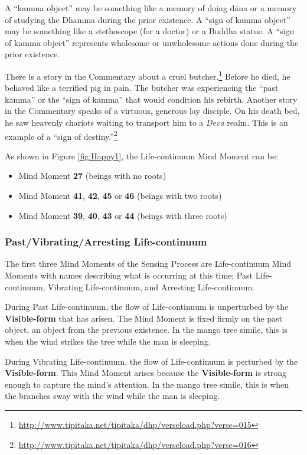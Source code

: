 A “kamma object” may be something like a memory of doing dāna or a memory of studying the Dhamma during the prior existence. A “sign of kamma object” may be something like a stethoscope (for a doctor) or a Buddha statue. A “sign of kamma object” represents wholesome or unwholesome actions done during the prior existence. 

There is a story in the Commentary about a cruel butcher.\footnote{\url{http://www.tipitaka.net/tipitaka/dhp/verseload.php?verse=015}} Before he died, he behaved like a terrified pig in pain. The butcher was experiencing the “past kamma” or the “sign of kamma” that would condition his rebirth. Another story in the Commentary speaks of a virtuous, generous lay disciple. On his death bed, he saw heavenly chariots waiting to transport him to a \textit{Deva} realm. This is an example of a “sign of destiny.”\footnote{\url{http://www.tipitaka.net/tipitaka/dhp/verseload.php?verse=016}}

As shown in Figure \ref{fig:Happy1}, the Life-continuum Mind Moment can be:
\begin{itemize}[nosep]
\item Mind Moment \textbf{27} (beings with no roots)
\item Mind Moment \textbf{41}, \textbf{42}, \textbf{45} or \textbf{46} (beings with two roots)
\item Mind Moment \textbf{39}, \textbf{40}, \textbf{43} or \textbf{44} (beings with three roots)
\end{itemize}

\subsubsection*{Past/Vibrating/Arresting Life-continuum}

The first three Mind Moments of the Sensing Process are Life-continuum Mind Moments with names describing what is occurring at this time; Past Life-continuum, Vibrating Life-continuum, and Arresting Life-continuum.

\pagebreak

During Past Life-continuum, the flow of Life-continuum is unperturbed by the \textbf{Visible-form} that has arisen. The Mind Moment is fixed firmly on the past object, an object from the previous existence. In the mango tree simile, this is when the wind strikes the tree while the man is sleeping.

During Vibrating Life-continuum, the flow of Life-continuum is perturbed by the \textbf{Visible-form}. This Mind Moment arises because the \textbf{Visible-form} is strong enough to capture the mind’s attention. In the mango tree simile, this is when the branches sway with the wind while the man is sleeping.

